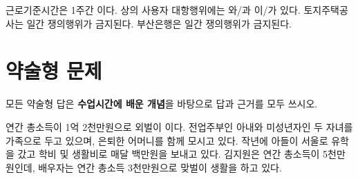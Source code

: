 \documentclass[11pt,answers]{exam} %
\begin{document}
\begin{questions}
 근로기준시간은 1주간 \fillin[34시간]{}이다.
 상의 사용자 대항행위에는 \fillin[직장폐쇄]{}와/과 \fillin[조업계속]{} 이/가 있다.
 토지주택공사는 \fillin[10]{}일간 쟁의행위가 금지된다. 부산은행은 \fillin[15]{}일간 쟁의행위가 금지된다.

\pagebreak

\section*{약술형 문제}
모든 약술형 답은 \textbf{수업시간에 배운 개념}을 바탕으로 답과 근거를 모두 쓰시오.

 연간 총소득이 1억 2천만원으로 외벌이 이다. 전업주부인 아내와 미성년자인 두 자녀를 가족으로 두고 있으며, 은퇴한 어머니를 함께 모시고 있다. 작년에 아들이 서울로 유학을 갔고 학비 및 생활비로 매달 백만원을 보내고 있다. 김지원은 연간 총소득이 5천만원인데, 배우자는 연간 총소득 3천만원으로 맞벌이 생활을 하고 있다.
\end{questions}
\end{document}
